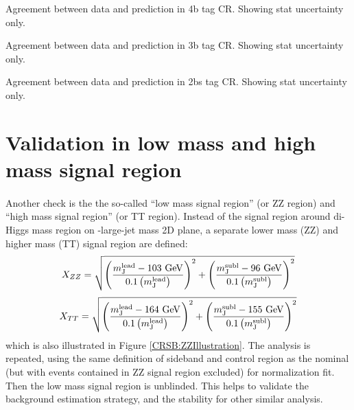 \begin{table}[htbp!]
\begin{center}

\end{center}
\caption{Agreement between data and prediction in 4b tag CR. Showing stat uncertainty only.}
\label{CRSB:Tab_4b_CR_Variations}
\end{table}

\begin{table}[htbp!]
\begin{center}

\end{center}
\caption{Agreement between data and prediction in 3b tag CR. Showing stat uncertainty only.}
\label{CRSB:Tab_3b_CR_Variations}
\end{table}
\begin{table}[htbp!]
\begin{center}

\end{center}
\caption{Agreement between data and prediction in 2bs tag CR. Showing stat uncertainty only.}
\label{CRSB:Tab_2bs_CR_Variations}
\end{table}


\section{Validation in low mass and high mass signal region}
\label{sec:boosted-ZZ-Rehearsal}
\paragraph{}
Another check is the the so-called ``low mass signal region'' (or ZZ region) and ``high mass signal region'' (or TT region). 
Instead of the signal region around di-Higgs mass region on \mleadJ-\msublJ large-\R jet mass 2D plane, a separate lower mass (ZZ) and higher mass (TT) signal region are defined: 
\begin{equation}
X_{ZZ} = \sqrt{\left(\frac{m^{\rm lead}_{\rm J} - \text{103 GeV}}{0.1 \left(m^{\rm lead}_{\rm J}\right)}\right)^2 + \left(\frac{m^{\rm subl}_{\rm J}- \text{96 GeV}}{0.1 \left(m^{\rm subl}_{\rm J}\right)}\right)^2}
\label{eq:boosted_Xzz}
\end{equation}
\begin{equation}
X_{TT} = \sqrt{\left(\frac{m^{\rm lead}_{\rm J} - \text{164 GeV}}{0.1 \left(m^{\rm lead}_{\rm J}\right)}\right)^2 + \left(\frac{m^{\rm subl}_{\rm J}- \text{155 GeV}}{0.1 \left(m^{\rm subl}_{\rm J}\right)}\right)^2}
\label{eq:boosted_Xtt}
\end{equation}
which is also illustrated in Figure \ref{CRSB:ZZIllustration}. 
The analysis is repeated, using the same definition of sideband and control region as the nominal (but with events contained in ZZ signal region excluded) for normalization fit. 
Then the low mass signal region is unblinded. 
This helps to validate the background estimation strategy, and the stability for other similar analysis.

